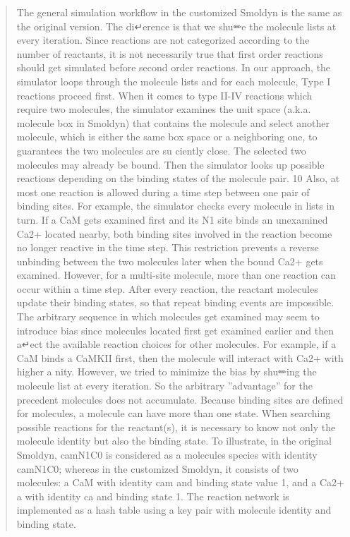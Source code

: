 \begin{quote}
The general simulation workflow in the customized Smoldyn is the same as the original version. The di↵erence is that we shu✏e the molecule lists at every iteration. Since reactions are not categorized according to the number of reactants, it is not necessarily true that first order reactions should get simulated before second order reactions. In our approach, the simulator loops through the molecule lists and for each molecule, Type I reactions proceed first. When it comes to type II-IV reactions which require two molecules, the simulator examines the unit space (a.k.a. molecule box in Smoldyn) that contains the molecule and select another molecule, which is either the same box space or a neighboring one, to guarantees the two molecules are su ciently close. The selected two molecules may already be bound. Then the simulator looks up possible reactions depending on the binding states of the molecule pair.
10
Also, at most one reaction is allowed during a time step between one pair of binding sites. For example, the simulator checks every molecule in lists in turn. If a CaM gets examined first and its N1 site binds an unexamined Ca2+ located nearby, both binding sites involved in the reaction become no longer reactive in the time step. This restriction prevents a reverse unbinding between the two molecules later when the bound Ca2+ gets examined. However, for a multi-site molecule, more than one reaction can occur within a time step. After every reaction, the reactant molecules update their binding states, so that repeat binding events are impossible. The arbitrary sequence in which molecules get examined may seem to introduce bias since molecules located first get examined earlier and then a↵ect the available reaction choices for other molecules. For example, if a CaM binds a CaMKII first, then the molecule will interact with Ca2+ with higher a nity. However, we tried to minimize the bias by shu✏ing the molecule list at every iteration. So the arbitrary ”advantage” for the precedent molecules does not accumulate.
Because binding sites are defined for molecules, a molecule can have more than one state. When searching possible reactions for the reactant(s), it is necessary to know not only the molecule identity but also the binding state. To illustrate, in the original Smoldyn, camN1C0 is considered as a molecules species with identity camN1C0; whereas in the customized Smoldyn, it consists of two molecules: a CaM with identity cam and binding state value 1, and a Ca2+ a with identity ca and binding state 1. The reaction network is implemented as a hash table using a key pair with molecule identity and binding state.

\end{quote}

